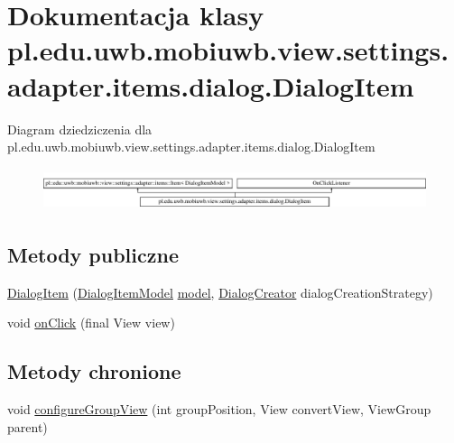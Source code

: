 \hypertarget{classpl_1_1edu_1_1uwb_1_1mobiuwb_1_1view_1_1settings_1_1adapter_1_1items_1_1dialog_1_1_dialog_item}{}\section{Dokumentacja klasy pl.\+edu.\+uwb.\+mobiuwb.\+view.\+settings.\+adapter.\+items.\+dialog.\+Dialog\+Item}
\label{classpl_1_1edu_1_1uwb_1_1mobiuwb_1_1view_1_1settings_1_1adapter_1_1items_1_1dialog_1_1_dialog_item}
Diagram dziedziczenia dla pl.\+edu.\+uwb.\+mobiuwb.\+view.\+settings.\+adapter.\+items.\+dialog.\+Dialog\+Item\begin{figure}[H]
\begin{center}
\leavevmode
\includegraphics[height=1.247216cm]{classpl_1_1edu_1_1uwb_1_1mobiuwb_1_1view_1_1settings_1_1adapter_1_1items_1_1dialog_1_1_dialog_item}
\end{center}
\end{figure}
\subsection*{Metody publiczne}
\begin{DoxyCompactItemize}
\item 
\hyperlink{classpl_1_1edu_1_1uwb_1_1mobiuwb_1_1view_1_1settings_1_1adapter_1_1items_1_1dialog_1_1_dialog_item_ab8ae9fb36d90feb90d1ed59509946d0a}{Dialog\+Item} (\hyperlink{classpl_1_1edu_1_1uwb_1_1mobiuwb_1_1view_1_1settings_1_1adapter_1_1items_1_1dialog_1_1_dialog_item_model}{Dialog\+Item\+Model} \hyperlink{classpl_1_1edu_1_1uwb_1_1mobiuwb_1_1view_1_1settings_1_1adapter_1_1items_1_1_item_a318c5a53677362bdb6d6324d8f132ba6}{model}, \hyperlink{classpl_1_1edu_1_1uwb_1_1mobiuwb_1_1controls_1_1dialogs_1_1_dialog_creator}{Dialog\+Creator} dialog\+Creation\+Strategy)
\item 
void \hyperlink{classpl_1_1edu_1_1uwb_1_1mobiuwb_1_1view_1_1settings_1_1adapter_1_1items_1_1dialog_1_1_dialog_item_aacd4b451d119245dd706ab0899d3dbc0}{on\+Click} (final View view)
\end{DoxyCompactItemize}
\subsection*{Metody chronione}
\begin{DoxyCompactItemize}
\item 
void \hyperlink{classpl_1_1edu_1_1uwb_1_1mobiuwb_1_1view_1_1settings_1_1adapter_1_1items_1_1dialog_1_1_dialog_item_a7d98952848321b137c8693b3ae84cdfc}{configure\+Group\+View} (int group\+Position, View convert\+View, View\+Group parent)
\end{DoxyCompactItemize}
